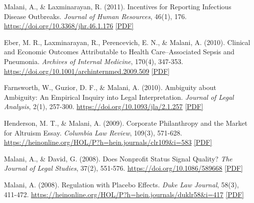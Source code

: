\begin{tablist}
        \item[2011] \tab{}Malani, A., \& Laxminarayan, R. (2011). Incentives for Reporting Infectious Disease Outbreaks. \textit{Journal of Human Resources}, 46(1), 176. \href{https://doi.org/10.3368/jhr.46.1.176}{https://doi.org/10.3368/jhr.46.1.176} \href{https://github.com/anup-malani/website_personal/blob/main/publications/2011_MalaniLaxminarayan_JHR_IncentivesDiseaseReporting.pdf}{[PDF]} 
    
        \item[2010] \tab{}Eber, M. R., Laxminarayan, R., Perencevich, E. N., \& Malani, A. (2010). Clinical and Economic Outcomes Attributable to Health Care–Associated Sepsis and Pneumonia. \textit{Archives of Internal Medicine}, 170(4), 347-353. \href{https://doi.org/10.1001/archinternmed.2009.509}{https://doi.org/10.1001/archinternmed.2009.509} \href{https://github.com/anup-malani/website_personal/blob/main/publications/2010_EberMalani_ArchiveIntMed_HAI.pdf}{[PDF]} 
    
        \item[2010] \tab{}Farnsworth, W., Guzior, D. F., \& Malani, A. (2010). Ambiguity about Ambiguity: An Empirical Inquiry into Legal Interpretation. \textit{Journal of Legal Analysis}, 2(1), 257-300. \href{https://doi.org/10.1093/jla/2.1.257}{https://doi.org/10.1093/jla/2.1.257} \href{https://github.com/anup-malani/website_personal/blob/main/publications/2010_FarnsworthGuziorMalani_JLA_Ambiguity.pdf}{[PDF]}

        \item[2009] \tab{}Henderson, M. T., \& Malani, A. (2009). Corporate Philanthropy and the Market for Altruism Essay. \textit{Columbia Law Review}, 109(3), 571-628. \href{https://heinonline.org/HOL/P?h=hein.journals/clr109&i=583}{https://heinonline.org/HOL/P?h=hein.journals/clr109\&i=583} \href{https://github.com/anup-malani/website_personal/blob/main/publications/2009_Henderson_Malani_CorporatePhilathropy.pdf}{[PDF]} 
    
        \item[2008] \tab{}Malani, A., \& David, G. (2008). Does Nonprofit Status Signal Quality? \textit{The Journal of Legal Studies}, 37(2), 551-576. \href{https://doi.org/10.1086/589668}{https://doi.org/10.1086/589668} \href{https://github.com/anup-malani/website_personal/blob/main/publications/2008_Malani_JLS_NonProfitSignalQuality.pdf}{[PDF]} 
    
        \item[2008] \tab{}Malani, A. (2008). Regulation with Placebo Effects. \textit{Duke Law Journal}, 58(3), 411-472. \href{https://heinonline.org/HOL/P?h=hein.journals/duklr58&i=417}{https://heinonline.org/HOL/P?h=hein.journals/duklr58\&i=417} \href{https://github.com/anup-malani/website_personal/blob/main/publications/2008_Malani_DukeLJ_RegulationPlaceboEffects.pdf}{[PDF]}


\end{tablist}

